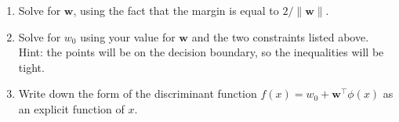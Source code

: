 \documentclass{article}
\begin{document}
\begin{enumerate}
\begin{enumerate}
		\item Solve for \(\mathbf{w}\), using the fact that the margin is equal to \(2/\lVert\mathbf{w}\rVert\).
		\item Solve for \(w_0\) using your value for \(\mathbf{w}\) and the two constraints listed above. Hint: the points will be on the decision boundary, so the inequalities will be tight.
		\item Write down the form of the discriminant function \(f(x) = w_0+\mathbf{w}^\top\phi(x)\) as an explicit function of \(x\).
	\end{enumerate}
\end{enumerate}
\end{document}
